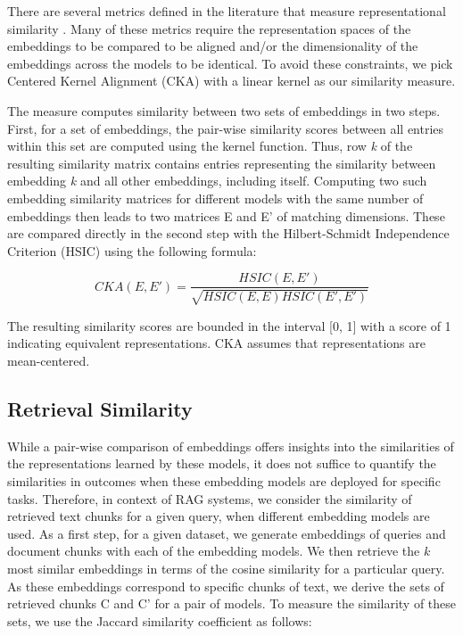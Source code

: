 \documentclass[nonacm,sigconf]{acmart}
\begin{document}
There are several metrics defined in the literature that measure representational similarity \cite{similarity}. Many of these metrics require the representation spaces of the embeddings to be compared to be aligned and/or the dimensionality of the embeddings across the models to be identical. To avoid these constraints, we pick Centered Kernel Alignment (CKA) \cite{cka} with a linear kernel as our similarity measure.

The measure computes similarity between two sets of embeddings in two steps. First, for a set of embeddings, the pair-wise similarity scores between all entries within this set are computed using the kernel function. Thus, row \textit{k} of the resulting similarity matrix contains entries representing the similarity between embedding \textit{k} and all other embeddings, including itself. Computing two such embedding similarity matrices for different models with the same number of embeddings then leads to two matrices E and E' of matching dimensions. These are compared directly in the second step with the Hilbert-Schmidt Independence Criterion (HSIC) \cite{hsic} using the following formula:

\begin{equation}
    CKA(E, E') = \frac{HSIC(E, E')}{\sqrt{HSIC(E, E)HSIC(E', E')}}
\end{equation}

The resulting similarity scores are bounded in the interval [0, 1] with a score of 1 indicating equivalent representations. CKA assumes that representations are mean-centered.

\subsection{Retrieval Similarity}
While a pair-wise comparison of embeddings offers insights into the similarities of the representations learned by these models, it does not suffice to quantify the similarities in outcomes when these embedding models are deployed for specific tasks. Therefore, in context of RAG systems, we consider the similarity of retrieved text chunks for a given query, when different embedding models are used. As a first step, for a given dataset, we generate embeddings of queries and document chunks with each of the embedding models.  We then retrieve the $k$ most similar embeddings in terms of the cosine similarity for a particular query. As these embeddings correspond to specific chunks of text, we derive the sets of retrieved chunks C and C' for a pair of models. To measure the similarity of these sets, we use the Jaccard similarity coefficient as follows:
\end{document}
